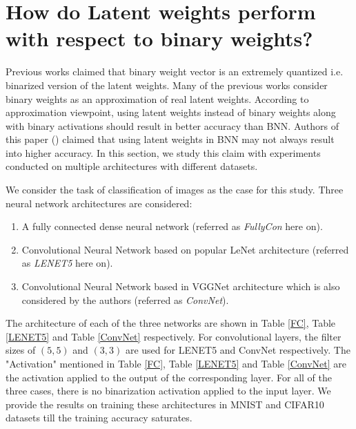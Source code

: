 \section{How do Latent weights perform with respect to binary weights?}

Previous works claimed that binary weight vector is an extremely quantized i.e. binarized version of the latent weights. Many of the previous works consider binary weights as an approximation of real latent weights. According to approximation viewpoint, using latent weights instead of binary weights along with binary activations should result in better accuracy than BNN. Authors of this paper (\cite{helwegen2019latent}) claimed that using latent weights in BNN may not always result into higher accuracy. In this section, we study this claim with experiments conducted on multiple architectures with different datasets.

We consider the task of classification of images as the case for this study. Three neural network architectures are considered:
\begin{enumerate}
    \item A fully connected dense neural network (referred as \textit{FullyCon} here on).
    \item Convolutional Neural Network based on popular LeNet architecture (referred as \textit{LENET5} here on).
    \item Convolutional Neural Network based in VGGNet architecture which is also considered by the authors (referred as \textit{ConvNet}).
\end{enumerate}
The architecture of each of the three networks are shown in Table \ref{FC}, Table \ref{LENET5} and Table \ref{ConvNet} respectively. For convolutional layers, the filter sizes of $(5,5)$ and $(3,3)$ are used for LENET5 and ConvNet respectively. The "Activation" mentioned in Table \ref{FC}, Table \ref{LENET5} and Table \ref{ConvNet} are the activation applied to the output of the corresponding layer. For all of the three cases, there is no binarization activation applied to the input layer. We provide the results on training these architectures in  MNIST and CIFAR10 datasets till the training accuracy saturates.

